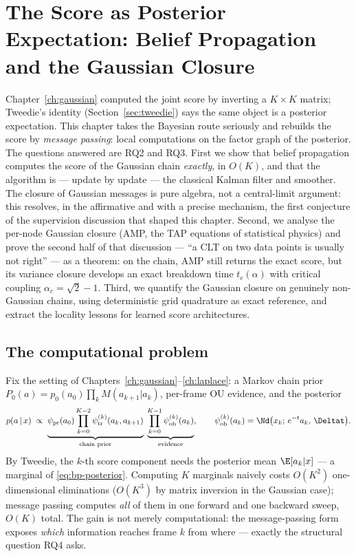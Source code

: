 \chapter{The Score as Posterior Expectation: Belief Propagation and the
Gaussian Closure}\label{ch:bp}

Chapter~\ref{ch:gaussian} computed the joint score by inverting a
$K \times K$ matrix; Tweedie's identity (Section~\ref{sec:tweedie}) says the
same object is a posterior expectation. This chapter takes the Bayesian
route seriously and rebuilds the score by \emph{message passing}: local
computations on the factor graph of the posterior. The questions answered
are RQ2 and RQ3. First we show that belief propagation computes the score
of the Gaussian chain \emph{exactly}, in $O(K)$, and that the algorithm is
--- update by update --- the classical Kalman filter and smoother. The
closure of Gaussian messages is pure algebra, not a central-limit argument:
this resolves, in the affirmative and with a precise mechanism, the first
conjecture of the supervision discussion that shaped this chapter. Second,
we analyse the per-node Gaussian closure (AMP, the TAP equations of
statistical physics) and prove the second half of that discussion --- ``a
CLT on two data points is usually not right'' --- as a theorem: on the
chain, AMP still returns the exact score, but its variance closure
develops an exact breakdown time $t_c(\alpha)$ with critical coupling
$\alpha_c = \sqrt{2} - 1$. Third, we quantify the Gaussian closure on
genuinely non-Gaussian chains, using deterministic grid quadrature as exact
reference, and extract the locality lessons for learned score
architectures.

\section{The computational problem}\label{sec:bp-problem}

Fix the setting of Chapters~\ref{ch:gaussian}--\ref{ch:laplace}: a Markov
chain prior $P_0(a) = p_0(a_0) \prod_k M(a_{k+1} | a_k)$, per-frame OU
evidence, and the posterior
\begin{equation}
  p(a \,|\, x) \;\propto\;
  \underbrace{\psi_{\mathrm{pr}}(a_0)
  \prod_{k=0}^{K-2} \psi^{(k)}_{\mathrm{tr}}(a_k, a_{k+1})}_{\text{chain prior}}
  \;
  \underbrace{\prod_{k=0}^{K-1} \psi^{(k)}_{\mathrm{ob}}(a_k)}_{\text{evidence}},
  \qquad
  \psi^{(k)}_{\mathrm{ob}}(a_k) = \Nd\big(x_k;\, e^{-t}a_k,\, \Deltat\big).
  \label{eq:bp-posterior}
\end{equation}
By Tweedie, the $k$-th score component needs the posterior mean
$\E[a_k | x]$ --- a marginal of \eqref{eq:bp-posterior}. Computing $K$
marginals naively costs $O(K^2)$ one-dimensional eliminations ($O(K^3)$ by
matrix inversion in the Gaussian case); message passing computes \emph{all}
of them in one forward and one backward sweep, $O(K)$ total. The gain is
not merely computational: the message-passing form exposes \emph{which}
information reaches frame $k$ from where --- exactly the structural
question RQ4 asks.

